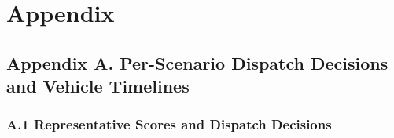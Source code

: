 \documentclass{swmcmthesis}
\begin{document}
\section*{Appendix}

\subsection*{Appendix A. Per-Scenario Dispatch Decisions and Vehicle Timelines}
\label{app:q4}

\subsubsection*{A.1 Representative Scores and Dispatch Decisions}
\end{document}
